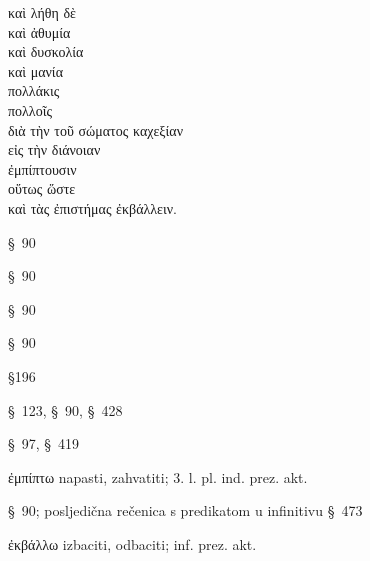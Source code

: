 
{\large
\begin{greek}
\noindent καὶ λήθη δὲ \\
καὶ ἀθυμία \\
καὶ δυσκολία \\
καὶ μανία \\
\tabto{2em} πολλάκις \\
\tabto{2em} πολλοῖς \\
\tabto{2em} διὰ τὴν τοῦ σώματος καχεξίαν \\
\tabto{2em} εἰς τὴν διάνοιαν \\
ἐμπίπτουσιν \\
\tabto{2em} οὕτως ὥστε \\
\tabto{4em} καὶ τὰς ἐπιστήμας ἐκβάλλειν.\\

\end{greek}
}

\begin{description}[noitemsep]
\item[λήθη ] §~90
\item[ἀθυμία] §~90
\item[δυσκολία] §~90
\item[μανία] §~90
\item[πολλοῖς] §196
\item[διὰ τὴν τοῦ σώματος καχεξίαν] §~123, §~90, §~428
\item[εἰς τὴν διάνοιαν] §~97, §~419
\item[ἐμπίπτουσιν] ἐμπίπτω napasti, zahvatiti; 3. l. pl. ind. prez. akt.
\item[ὥστε καὶ τὰς ἐπιστήμας ἐκβάλλειν] §~90; posljedična rečenica s predikatom u infinitivu §~473
\item[ἐκβάλλειν] ἐκβάλλω izbaciti, odbaciti; inf. prez. akt.
\end{description}

